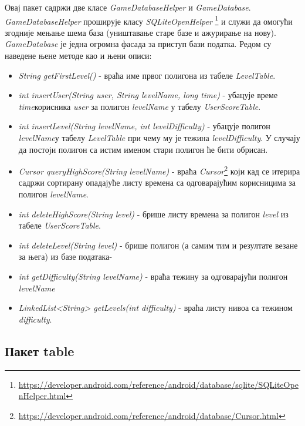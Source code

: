 Овај пакет садржи две класе \emph{GameDatabaseHelper} и \emph{GameDatabase}.  \emph{GameDatabaseHelper} проширује класу \emph{SQLiteOpenHelper} \footnote{\url{https://developer.android.com/reference/android/database/sqlite/SQLiteOpenHelper.html}} и служи да омогући згодније мењање шема база (уништавање старе базе и ажурирање на нову).
\\ \indent
 \emph{GameDatabase} је једна огромна фасада за приступ бази податка. 
Редом су наведене њене методе као и њени описи:
\begin{itemize}
\item \emph{String getFirstLevel()} - враћа име првог полигона из табеле \emph{LevelTable}.
\item \emph{int insertUser(String user, String levelName, long time)} - убацује време \emph{time}корисника \emph{user} за полигон \emph{levelName} у табелу \emph{UserScoreTable}.
\item \emph{int insertLevel(String levelName, int levelDifficulty)} - убацује полигон \emph{levelName}у табелу \emph{LevelTable} при чему му је тежина \emph{levelDifficulty}. У случају да постоји полигон са истим именом стари полигон ће бити обрисан.
\item \emph{Cursor queryHighScore(String levelName)} - враћа \emph{Cursor}\footnote{\url{https://developer.android.com/reference/android/database/Cursor.html}} који кад се итерира садржи сортирану опадајуће листу времена са одговарајућим корисницима за полигон \emph{levelName}.
\item \emph{int deleteHighScore(String level)} - брише листу времена за полигон \emph{level} из табеле \emph{UserScoreTable}.
\item \emph{int deleteLevel(String level)} - брише полигон (а самим тим и резултате везане за њега) из базе података-
\item \emph{int getDifficulty(String levelName)} - враћа тежину за одговарајући полигон \emph{levelName}
\item \emph{LinkedList<String> getLevels(int difficulty)} - враћа листу  нивоа са тежином \emph{difficulty}.
\end{itemize}

\subsection{Пакет table}

